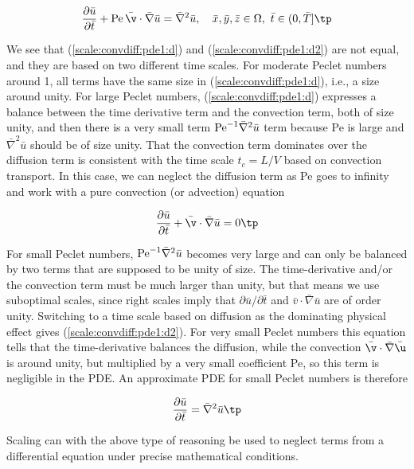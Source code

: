 \documentclass[graybox,envcountchap,sectrefs,final]{svmonodo}
\newenvironment{notice_mdfboxadmon}[1][]{
\begin{notice_mdfboxmdframed}[frametitle=#1]
}
{
\end{notice_mdfboxmdframed}
}
\begin{document}
\begin{equation}
\frac{\partial \bar u}{\partial \bar t} +
\hbox{Pe}\,\bar\v\cdot\bar\nabla\bar u =
\bar\nabla^2\bar u,
\quad \bar x,\bar y,\bar z\in \Omega,\ \bar t\in (0,\bar T]\tp
\label{scale:convdiff:pde1:d2}
\end{equation}


\begin{notice_mdfboxadmon}
We see that (\ref{scale:convdiff:pde1:d}) and (\ref{scale:convdiff:pde1:d2})
are not equal, and they are based on two different time scales.
For moderate Peclet numbers around 1, all terms have the same size
in (\ref{scale:convdiff:pde1:d}), i.e., a size around unity.
For large Peclet numbers,
(\ref{scale:convdiff:pde1:d}) expresses a balance
between the time derivative term and the convection term, both of size
unity, and then there is a very small term
$\hbox{Pe}^{-1}\bar\nabla^2\bar u$ term because Pe is large and
$\bar\nabla^2\bar u$ should be of size unity.
That the convection term dominates over the diffusion term is
consistent with the time scale $t_c=L/V$ based on convection transport.
In this case, we can neglect the diffusion term as Pe goes to infinity
and work with a pure convection (or advection) equation

\[
\frac{\partial \bar u}{\partial \bar t} +
\bar\v\cdot\bar\nabla\bar u = 0\tp
\]

For small Peclet numbers, $\hbox{Pe}^{-1}\bar\nabla^2\bar u$ becomes
very large and can only be balanced by two terms that are supposed to
be unity of size.  The time-derivative and/or the convection term must
be much larger than unity, but that means we use suboptimal scales,
since right scales imply that $\partial\bar u/\partial\bar t$ and
$\bar v\cdot\bar\nabla\bar u$ are of order unity. Switching to a time
scale based on diffusion as the dominating physical effect gives
(\ref{scale:convdiff:pde1:d2}).  For very small Peclet numbers this
equation tells that the time-derivative balances the diffusion, while
the convection $\bar\v\cdot\bar\nabla\bar\u$ is around
unity, but multiplied by a very small coefficient Pe, so this term is
negligible in the PDE. An approximate PDE for small Peclet numbers is
therefore

\[
\frac{\partial \bar u}{\partial \bar t}
= \bar\nabla^2\bar u\tp
\]

Scaling can with the above type of reasoning be used
to neglect terms from a differential equation under precise mathematical
conditions.
\end{notice_mdfboxadmon}
\end{document}
